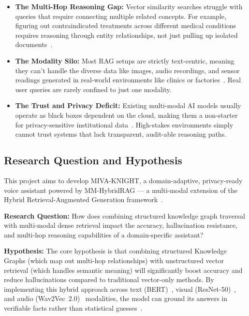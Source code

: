 \documentclass[12pt, a4paper]{article}
\begin{document}
\begin{itemize}[leftmargin=1.5em]
  \item \textbf{The Multi-Hop Reasoning Gap:} Vector similarity searches
    struggle with queries that require connecting multiple related concepts. For
    example, figuring out contraindicated treatments across different medical
    conditions requires reasoning through entity relationships, not just pulling
    up isolated documents~\cite{sarmah2024hybridrag}.

  \item \textbf{The Modality Silo:} Most RAG setups are strictly text-centric,
    meaning they can't handle the diverse data like images, audio recordings,
    and sensor readings generated in real-world environments like clinics or
    factories~\cite{kadam2022multimodal}. Real user queries are rarely confined
    to just one modality.

  \item \textbf{The Trust and Privacy Deficit:} Existing multi-modal AI models
    usually operate as black boxes dependent on the cloud, making them a
    non-starter for privacy-sensitive institutional
    data~\cite{pan2024unifying}. High-stakes environments simply cannot trust
    systems that lack transparent, audit-able reasoning paths.
\end{itemize}

\subsection{Research Question and Hypothesis}

This project aims to develop MIVA-KNIGHT, a domain-adaptive, privacy-ready
voice assistant powered by MM-HybridRAG --- a multi-modal extension of the
Hybrid Retrieval-Augmented Generation
framework~\cite{sarmah2024hybridrag}.

\noindent\textbf{Research Question:} How does combining structured knowledge
graph traversal with multi-modal dense retrieval impact the accuracy,
hallucination resistance, and multi-hop reasoning capabilities of a
domain-specific assistant?

\noindent\textbf{Hypothesis:} The core hypothesis is that combining structured
Knowledge Graphs (which map out multi-hop relationships) with unstructured
vector retrieval (which handles semantic meaning) will significantly boost
accuracy and reduce hallucinations compared to traditional vector-only methods.
By implementing this hybrid approach across text
(BERT)~\cite{devlin2019bert}, visual (ResNet-50)~\cite{he2016deep}, and audio
(Wav2Vec~2.0)~\cite{baevski2020wav2vec} modalities, the model can ground its
answers in verifiable facts rather than statistical
guesses~\cite{kadam2022multimodal}.
\end{document}
